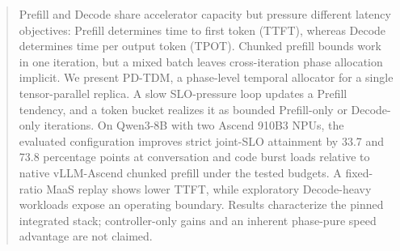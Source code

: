 \begin{abstract}
Prefill and Decode share accelerator capacity but pressure different latency
objectives: Prefill determines time to first token (TTFT), whereas Decode
determines time per output token (TPOT). Chunked prefill bounds work in one
iteration, but a mixed batch leaves cross-iteration phase allocation implicit.
We present PD-TDM, a phase-level temporal allocator for a single
tensor-parallel replica. A slow SLO-pressure loop updates a Prefill tendency,
and a token bucket realizes it as bounded Prefill-only or Decode-only
iterations. On Qwen3-8B with two Ascend 910B3 NPUs, the evaluated configuration
improves strict joint-SLO attainment by 33.7 and 73.8 percentage points at
conversation and code burst loads relative to native vLLM-Ascend chunked
prefill under the tested budgets. A fixed-ratio MaaS replay shows lower TTFT,
while exploratory Decode-heavy workloads expose an operating boundary. Results
characterize the pinned integrated stack; controller-only gains and an inherent
phase-pure speed advantage are not claimed.
\end{abstract}
